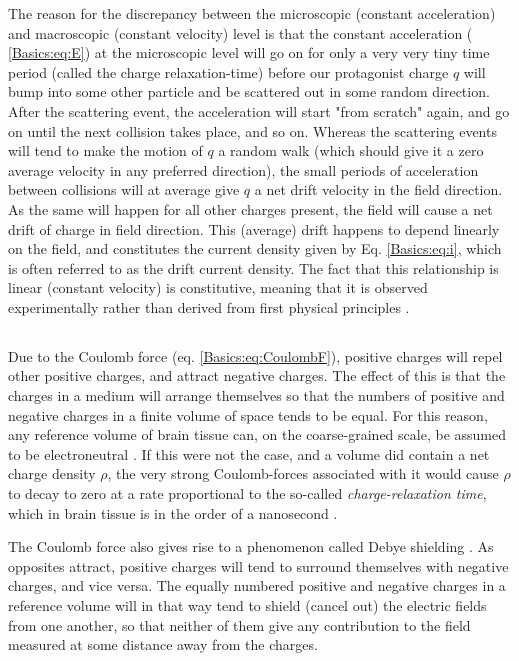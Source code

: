 The reason for the discrepancy between the microscopic (constant acceleration) and macroscopic (constant velocity) level is that the constant acceleration ( \ref{Basics:eq:E}) at the microscopic level will go on for only a very very tiny time period (called the charge relaxation-time) before our protagonist charge $q$ will bump into some other particle and be scattered out in some random direction. After the scattering event, the acceleration will start "from scratch" again, and go on until the next collision takes place, and so on. Whereas the scattering events will tend to make the motion of $q$ a random walk (which should give it a zero average velocity in any preferred direction), the small periods of acceleration between collisions will at average give $q$ a net drift velocity in the field direction. As the same will happen for all other charges present, the field will cause a net drift of charge in field direction. This (average) drift happens to depend linearly on the field, and constitutes the current density given by Eq. \ref{Basics:eq:i}, which is often referred to as the drift current density. The fact that this relationship is linear (constant velocity) is constitutive, meaning that it is observed experimentally rather than derived from first physical principles \citep{Nunez2006, Pettersen2012}.


\subsection{}
Due to the Coulomb force (eq. \ref{Basics:eq:CoulombF}), positive charges will repel other positive charges, and attract negative charges. The effect of this is that the charges in a medium will  arrange themselves so that the numbers of positive and negative charges in a finite volume of space tends to be equal. For this reason, any reference volume of brain tissue can, on the coarse-grained scale, be assumed to be electroneutral \cite{Nunez2006, Grodzinsky2011}. If this were not the case, and a volume did contain a net charge density $\rho$, the very strong Coulomb-forces associated with it would cause $\rho$ to decay to zero at a rate proportional to the so-called \textit{charge-relaxation time}, which in brain tissue is in the order of a nanosecond \cite{Grodzinsky2011}. 

The Coulomb force also gives rise to a phenomenon called Debye shielding \cite{Nunez2006}. As opposites attract, positive charges will tend to surround themselves with negative charges, and vice versa. The equally numbered positive and negative charges in a reference volume will in that way tend to shield (cancel out) the electric fields from one another, so that neither of them give any contribution to the field measured at some distance away from the charges.

